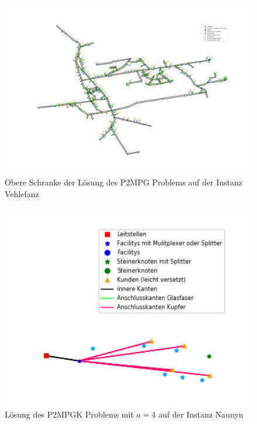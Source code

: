 \documentclass[11pt,a4paper]{article}
\theoremstyle{my_th_style1}
\begin{document}
\begin{figure}[!htbp]
	\begin{center}
		\begin{minipage}{15.0cm}
			\includegraphics[width=1\textwidth]{./Bilder/P2MPG_Vehlefanz_demand1_duration0_upperbound}
			\caption{Obere Schranke der L\"osung des P2MPG Problems auf der Instanz Vehlefanz}
			\label{p2mpg_v_pic_ub}
		\end{minipage}
	\end{center}
\end{figure}

\begin{figure}[!htbp]
	\begin{center}
		\begin{minipage}{8.0cm}
			\includegraphics[width=1\textwidth]{./Bilder/P2MPGK_Naunyn_demand1_duration0}
			\caption{L\"osung des P2MPGK Problems mit \(a = 4\) auf der Instanz Naunyn}
			\label{p2mpgk_n_pic_sn4}
		\end{minipage}
	\end{center}
\end{figure}
\end{document}
